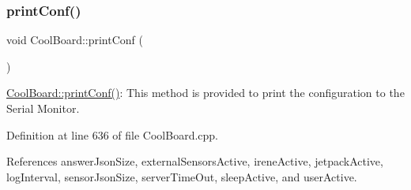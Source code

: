 \subsubsection{\texorpdfstring{print\+Conf()}{printConf()}}
{\footnotesize\ttfamily void Cool\+Board\+::print\+Conf (\begin{DoxyParamCaption}{ }\end{DoxyParamCaption})}

\hyperlink{classCoolBoard_a486507b8f0981d3cc671ed31c2145755}{Cool\+Board\+::print\+Conf()}\+: This method is provided to print the configuration to the Serial Monitor. 

Definition at line 636 of file Cool\+Board.\+cpp.



References answer\+Json\+Size, external\+Sensors\+Active, irene\+Active, jetpack\+Active, log\+Interval, sensor\+Json\+Size, server\+Time\+Out, sleep\+Active, and user\+Active.


